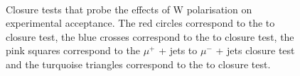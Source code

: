 \begin{figure}[h!]
 \begin{center}  
   ~~
  \caption{Closure tests that probe the effects of W polarisation on
    experimental acceptance. The red circles correspond to the \mj to
    \mmj closure test, the blue crosses correspond to the \mj to \gj closure test,
    the pink squares correspond to the $\mu^+$ + jets to $\mu^-$ + jets 
    closure test and the turquoise triangles correspond 
  to the \mmj to \gj closure test.}
  \label{fig:wpolCT}
 \end{center}
\end{figure}          
